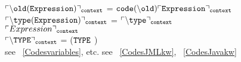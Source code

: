 \begin{appendix}
$\ulcorner \tt{\backslash old (Expression ) } \urcorner_{\tt{context}} $ = $\tt{code(\backslash old )} \ulcorner \tt{Expression} \urcorner_{\tt{context}}$ \\

$\ulcorner \backslash \tt{type}( Expression) \urcorner_{\tt{context}} $ = $\ulcorner \backslash \tt{type} \urcorner_{\tt{context}} $ \\
 $ \ulcorner Expression \urcorner_{\tt{context}} $\\




$\ulcorner \backslash \tt{TYPE} \urcorner_{\tt{context}} $ = \code($\tt{TYPE} $ ) \\ %
see  ~\ref{Codesvariables}, etc. see  ~\ref{CodesJMLkw}, ~\ref{CodesJavakw} \\ 



\end{appendix}
